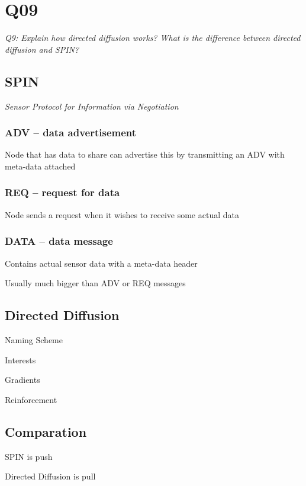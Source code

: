 \chapter{Q09}
\emph{Q9: Explain how directed diffusion works? What is the difference between
directed diffusion and SPIN?}

\section{SPIN}
\emph{Sensor Protocol for Information via Negotiation}

\subsection{ADV – data advertisement}
Node that has data to share can advertise this by transmitting an ADV with
meta-data attached

\subsection{REQ – request for data}
Node sends a request when it wishes to receive some actual data

\subsection{DATA – data message}

\begin{description}
	\item Contains actual sensor data with a meta-data header
	\item Usually much bigger than ADV or REQ messages
\end{description}


\section{Directed Diffusion}
\begin{description}
	\item Naming Scheme
	\item Interests
	\item Gradients
	\item Reinforcement
\end{description}

\section{Comparation}

\begin{description}
	\item SPIN is push
	\item Directed Diffusion is pull
\end{description}

